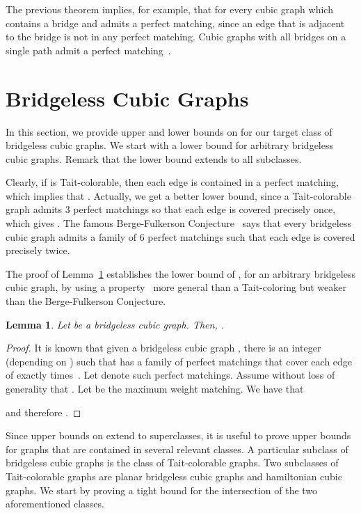 \documentclass{article}
\newtheorem{lem}[thm]{Lemma}
\begin{document}
The previous theorem implies, for example, that  for every cubic graph  which contains a bridge and admits a perfect matching, since an edge that is adjacent to the bridge is not in any perfect matching. Cubic graphs with all bridges on a single path admit a perfect matching~\cite{errera22}.

\section{Bridgeless Cubic Graphs}
\label{cubic}

In this section, we provide upper and lower bounds on  for our target class of bridgeless cubic graphs. We start with a lower bound for arbitrary bridgeless cubic graphs. Remark that the lower bound extends to all subclasses.

Clearly, if  is Tait-colorable, then each edge is contained in a perfect matching, which implies that . Actually, we get a better lower bound, since a Tait-colorable graph  admits 3 perfect matchings so that each edge is covered precisely once, which gives . The famous Berge-Fulkerson Conjecture~\cite{Fulkerson1971,Giuseppe} says that every bridgeless cubic graph admits a family of 6 perfect matchings such that each edge is covered precisely twice.

The proof of Lemma~\ref{lem:lb} establishes the lower bound of , for an arbitrary bridgeless cubic graph, by using a property~\cite{edmonds65} more general than a Tait-coloring but weaker than the Berge-Fulkerson Conjecture.

\begin{lem} \label{lem:lb}
Let  be a bridgeless cubic graph. Then, .
\end{lem}
\begin{proof}
It is known that given a bridgeless cubic graph , there is an integer  (depending on ) such that  has a family of  perfect matchings that cover each edge of  exactly  times~\cite{edmonds65}. Let  denote such perfect matchings. Assume without loss of generality that . Let  be the maximum weight matching. We have that

and therefore .
\end{proof}

Since upper bounds on  extend to superclasses, it is useful to prove upper bounds for graphs that are contained in several relevant classes. A particular subclass of bridgeless cubic graphs is the class of Tait-colorable graphs. Two subclasses of Tait-colorable graphs are planar bridgeless cubic graphs and hamiltonian cubic graphs. We start by proving a tight bound for the intersection of the two aforementioned classes.
\end{document}
